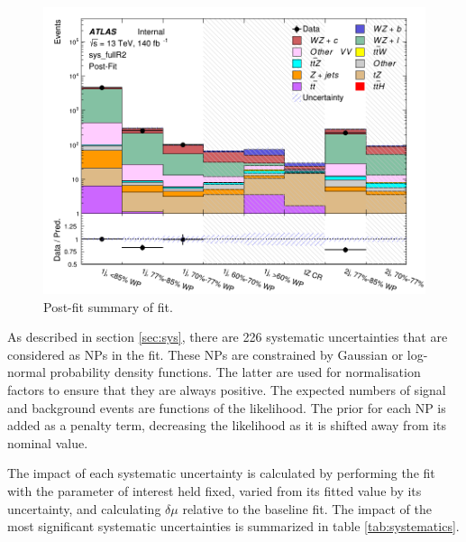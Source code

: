 \documentclass[NOTE, atlasdraft=true, texlive=2016, UKenglish]{\ATLASLATEXPATH atlasdoc}
\begin{document}
\begin{figure}[H]
    \center
    \includegraphics[width=.9\linewidth]{all_b/Summary_postFit.png}
    \caption{Post-fit summary of fit.}
    \label{fig:fit_results}
\end{figure}

As described in section \ref{sec:sys}, there are 226 systematic uncertainties that are considered as NPs in the fit. These NPs are constrained by Gaussian or log-normal probability density functions. The latter are used for normalisation factors to ensure that they are always positive. The expected numbers
of signal and background events are functions of the likelihood. The prior for each NP is added as a penalty term, decreasing the likelihood as it is shifted away from its nominal value. 

The impact of each systematic uncertainty is calculated by performing the fit with the parameter of interest held fixed, varied from its fitted value by its uncertainty, and calculating $\delta\mu$ relative to the baseline fit.  The impact of the most significant systematic uncertainties is summarized in table \ref{tab:systematics}. 
\end{document}
